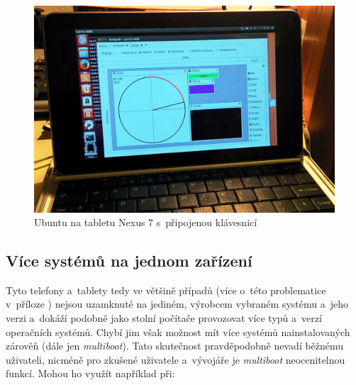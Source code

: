 \documentclass[12pt, a4paper, oneside]{article}
\newcommand{\It}{\textit}  %
\begin{document}
\begin{figure}[H]
\begin{center}
\includegraphics[width=\textwidth]{img/n7_ubuntu.jpg}
\caption{Ubuntu na tabletu Nexus 7 s~připojenou klávesnicí}
\end{center}
\end{figure}


\subsection{Více systémů na jednom zařízení}
Tyto telefony a~tablety tedy ve většině případů (více o~této problematice v~příloze ) nejsou uzamknuté na jediném, výrobcem vybraném systému a~jeho verzi a~dokáží podobně jako stolní počítače provozovat více typů a~verzí operačních systémů. Chybí jim však možnost mít více systémů nainstalovaných zárověň (dále jen \It{multiboot}). Tato skutečnost pravděpodobně nevadí běžnému uživateli, nicméně pro zkušené uživatele a~vývojáře je \It{multiboot} neocenitelnou funkcí. Mohou ho využít například při:
\end{document}
